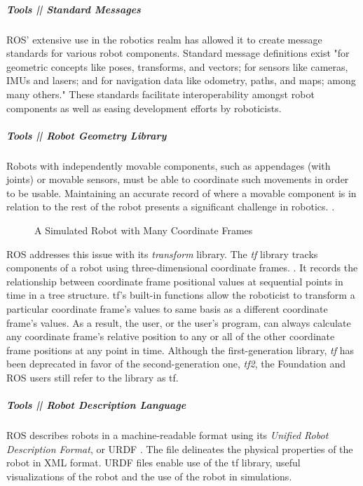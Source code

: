 \documentclass[9pt,twocolumn,twoside]{styles/osajnl}
\begin{document}
\subparagraph{Tools || Standard Messages}
ROS' extensive use in the robotics realm has allowed it to create message standards for various robot components. \cite{www-ros-core-components}  Standard message definitions exist "for geometric concepts like poses, transforms, and vectors; for sensors like cameras, IMUs and lasers; and for navigation data like odometry, paths, and maps; among many others."  These standards facilitate interoperability amongst robot components as well as easing development efforts by roboticists. 

\subparagraph{Tools || Robot Geometry Library}
Robots with independently movable components, such as appendages (with joints) or movable sensors, must be able to coordinate such movements in order to be usable.  Maintaining an accurate record of where a movable component is in relation to the rest of the robot presents a significant challenge in robotics. \cite{www-ros-core-components}. 

\begin{figure}[htbp]
\centering
{}
\caption{A Simulated Robot with Many Coordinate Frames \cite{www-ros-robot-geometry}}
\label{fig:robotgeometry}
\end{figure}

ROS addresses this issue with its \textit{transform} library.  The \textit{tf} library tracks components of a robot using three-dimensional coordinate frames. \cite{www-ros-robot-geometry}.  It records the relationship between coordinate frame positional values at sequential points in time in a tree structure.  tf's built-in functions allow the roboticist to transform a particular coordinate frame's values to same basis as a different coordinate frame's values.  As a result, the user, or the user's program, can always calculate any coordinate frame's relative position to any or all of the other coordinate frame positions at any point in time.  Although the first-generation library, \textit{tf} has been deprecated in favor of the second-generation one, \textit{tf2}, the Foundation and ROS users still refer to the library as tf.

\subparagraph{Tools || Robot Description Language}
ROS describes robots in a machine-readable format using its \textit{Unified Robot Description Format}, or URDF \cite{www-ros-core-components}.  The file delineates the physical properties of the robot in XML format.  URDF files enable use of the tf library, useful visualizations of the robot and the use of the robot in simulations.  
\end{document}
